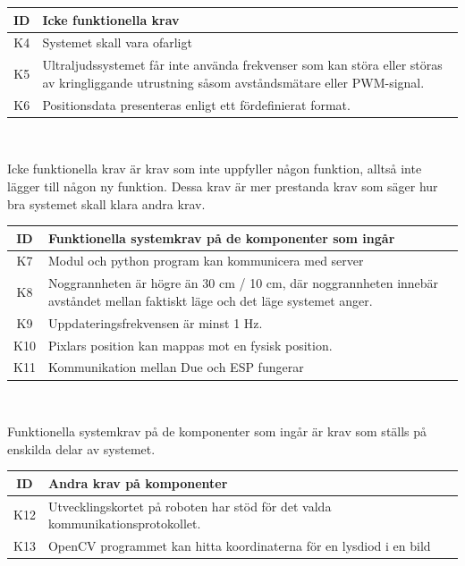 \documentclass[11pt, a4paper]{report}
\begin{document}
\begin{center}
	\begin{tabular}{c | p{13.5cm}}
	ID & Icke funktionella krav \\ \hline
	K4 & Systemet skall vara ofarligt \\
	K5 & Ultraljudssystemet får inte använda frekvenser som kan störa eller störas av kringliggande utrustning såsom avståndsmätare eller PWM-signal. \\
	K6 & Positionsdata presenteras enligt ett fördefinierat format. \\
	\end{tabular}
	\\ [0.5cm]
\end{center}

Icke funktionella krav är krav som inte uppfyller någon funktion, alltså inte lägger till någon ny funktion. Dessa krav är mer prestanda krav som säger hur bra systemet skall klara andra krav.

\begin{center}
	\begin{tabular}{c | p{13.5cm}}
	ID & Funktionella systemkrav på de komponenter som ingår \\ \hline
	K7 & Modul och python program kan kommunicera med server \\
	K8 & Noggrannheten är högre än 30 cm / 10 cm, där noggrannheten innebär avståndet mellan faktiskt läge och det läge systemet anger. \\
	K9 & Uppdateringsfrekvensen är minst 1 Hz. \\
	K10 & Pixlars position kan mappas mot en fysisk position. \\
	K11 & Kommunikation mellan Due och ESP fungerar \\	
	\end{tabular}
	\\ [0.5cm]
\end{center}

Funktionella systemkrav på de komponenter som ingår är krav som ställs på enskilda delar av systemet.

\begin{center}
	\begin{tabular}{c | p{13.5cm}}
	ID & Andra krav på komponenter \\ \hline
	K12 & Utvecklingskortet på roboten har stöd för det valda kommunikationsprotokollet. \\
	K13 & OpenCV programmet kan hitta koordinaterna för en lysdiod i en bild \\	
	\end{tabular}
	\\ [0.5cm]
\end{center}
\end{document}

